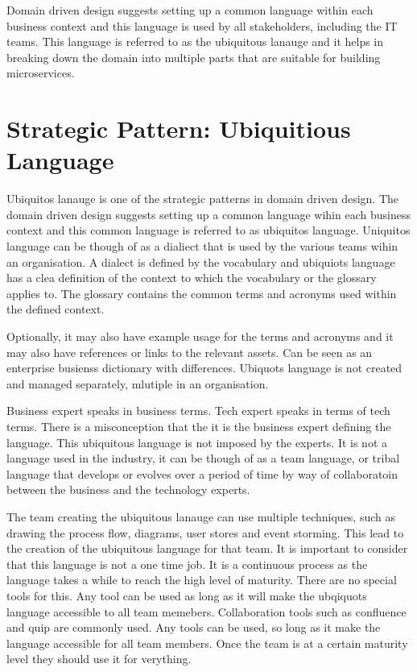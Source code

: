 \documentclass[a4paper, 11pt]{book}
\begin{document}
    Domain driven design suggests setting up a common language within each business context and this language is used by all stakeholders, including the IT teams.
    This language is referred to as the ubiquitous lanauge and it helps in breaking down the domain into multiple parts that are suitable for building microservices.

    \section{Strategic Pattern: Ubiquitious Language}
    Ubiquitos lanauge is one of the strategic patterns in domain driven design.
    The domain driven design suggests setting up a common language wihin each business context and this common language is referred to as ubiquitos language.
    Uniquitos language can be though of as a dialiect that is used by the various teams wihin an organisation.
    A dialect is defined by the vocabulary and ubiquiots language has a clea definition of the context to which the vocabulary or the glossary applies to.
    The glossary contains the common terms and acronyms used within the defined context.

    Optionally, it may also have example usage for the terms and acronyms and it may also have references or links to the relevant assets.
    Can be seen as an enterprise busienss dictionary with differences.
    Ubiquots language is not created and managed separately, mlutiple in an organisation.

    Business expert speaks in business terms. Tech expert speaks in terms of tech terms.
    There is a misconception that the it is the business expert defining the language. This ubiquitous language is not imposed by the experts.
    It is not a language used in the industry, it can be though of as a team language, or tribal language that develops or evolves over a period of time by way of collaboratoin between the business and the technology experts.

    The team creating the ubiquitous lanauge can use multiple techniques, such as drawing the process flow, diagrams, user stores and event storming.
    This lead to the creation of the ubiquitous language for that team.
    It is important to consider that this language is not a one time job.
    It is a continuous process as the language takes a while to reach the high level of maturity.
    There are no special tools for this. Any tool can be used as long as it will make the ubqiquots language accessible to all team memebers.
    Collaboration tools such as confluence and quip are commonly used.
    Any tools can be used, so long as it make the language accessible for all team members. Once the team is at a certain maturity level they should use it for verything.
\end{document}
